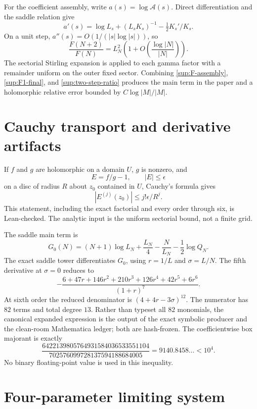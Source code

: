 \documentclass[10pt]{article}
\begin{document}
For the coefficient assembly, write $a(s)=\log\mathcal A(s)$.  Direct
differentiation and the saddle relation give
\[
 a'(s)=\log L_s+(L_sK_s)^{-1}-\tfrac12K_s'/K_s.
\]
On a unit step, $a''(s)=O(1/(|s|\log|s|))$, so
\begin{equation}\label{sup:two-step-ratio}
 \frac{F(N+2)}{F(N)}=L_N^2
 \left(1+O\left(\frac{\log|N|}{|N|}\right)\right).
\end{equation}
The sectorial Stirling expansion is applied to each gamma factor with a
remainder uniform on the outer fixed sector.  Combining
\eqref{sup:F-assembly}, \eqref{sup:F1-final}, and
\eqref{sup:two-step-ratio} produces the main term in the paper and a
holomorphic relative error bounded by $C\log|M|/|M|$.

\section{Cauchy transport and derivative artifacts}\label{sup:derivatives}

If $f$ and $g$ are holomorphic on a domain $U$, $g$ is nonzero, and
\[
 E=f/g-1,\qquad |E|\le\epsilon
\]
on a disc of radius $R$ about $z_0$ contained in $U$, Cauchy's formula gives
\begin{equation}\label{sup:cauchy}
 |E^{(j)}(z_0)|\le j!\epsilon/R^j.
\end{equation}
This statement, including the exact factorial and every order through six,
is Lean-checked.  The analytic input is the uniform sectorial bound, not a
finite grid.

The saddle main term is
\[
 G_0(N)=(N+1)\log L_N+\frac{L_N}{4}-\frac{N}{L_N}
 -\frac12\log Q_N.
\]
The exact saddle tower differentiates $G_0$, using $r=1/L$ and
$\sigma=L/N$.  The fifth derivative
at $\sigma=0$ reduces to
\begin{equation}\label{sup:H5}
 -\frac{6+47r+146r^2+210r^3+126r^4+42r^5+6r^6}{(1+r)^7}.
\end{equation}
At sixth order the reduced denominator is
$(4+4r-3\sigma)^{12}$.  The numerator has $82$ terms and total degree $13$.
Rather than typeset all $82$ monomials, the canonical expanded expression is
the output of the exact symbolic producer and the clean-room Mathematica
ledger; both are hash-frozen.  The coefficientwise box majorant is exactly
\[
 \frac{6422139805764931584036533551104}
 {702576099728137594188684005}=9140.8458\ldots<10^4.
\]
No binary floating-point value is used in this inequality.

\section{Four-parameter limiting system}\label{sup:branch}
\end{document}
